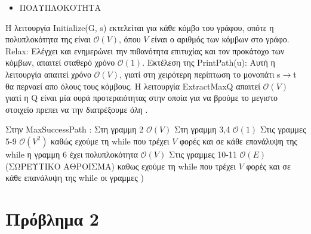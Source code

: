 \documentclass[a4paper,11pt]{article}
\begin{document}
\begin{itemize}
\item ΠΟΛΥΠΛΟΚΟΤΗΤΑ
\end{itemize}

Η λειτουργία Initialize(G, s) εκτελείται για κάθε κόμβο του γράφου, οπότε η πολυπλοκότητα της είναι $\mathcal{O}(V)$, όπου $V$ είναι ο αριθμός των κόμβων στο γράφο.
Relax: Ελέγχει και ενημερώνει την πιθανότητα επιτυχίας και τον προκάτοχο των κόμβων, απαιτεί σταθερό χρόνο $\mathcal{O}(1)$.
Εκτέλεση της PrintPath(u): Αυτή η λειτουργία απαιτεί χρόνο $\mathcal{O}(V)$, γιατί στη χειρότερη περίπτωση το μονοπάτι s$\rightarrow$t θα περναεί απο όλους τους κόμβους.
Η λειτουργία ExtractMaxQ απαιτεί $\mathcal{O}(V)$ γιατί η Q είναι μία ουρά προτεραιότητας στην οποία για να βρούμε το μεγιστο στοιχείο πρεπει να την διατρέξουμε όλη .

Στην MaxSuccessPath :
Στη γραμμη 2 $\mathcal{O}(V)$
Στη γραμμη 3,4 $\mathcal{O}(1)$
Στις γραμμες 5-9 $\mathcal{O}(V^2)$ καθώς εχούμε τη while που τρέχει $V$ φορές και σε κάθε επανάλυψη της while η γραμμη 6 έχει πολυπλοκότητα $\mathcal{O}(V)$
Στις γραμμες 10-11 $\mathcal{O}(E)$(ΣΩΡΕΥΤΙΚΟ ΑΘΡΟΙΣΜΑ)
καθως εχούμε τη while που τρέχει $V$ φορές και σε κάθε επανάλυψη της while οι γραμμες
)

\newpage

\section*{Πρόβλημα 2}
\end{document}
